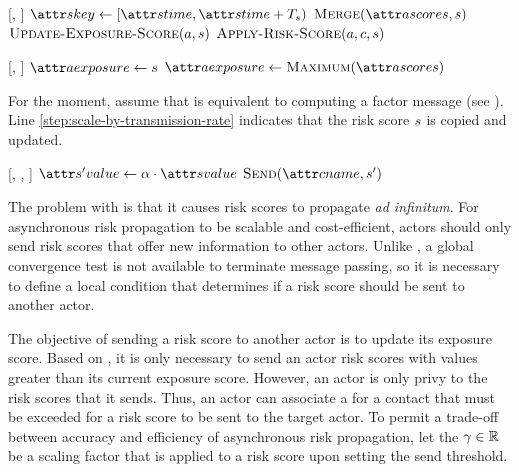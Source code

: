 \begin{function}[H]{\nHandleRiskScore}[\vActor, \vScore]
    \State $\aScoreKey \assign [\aScoreTime, \aScoreTime + \pScoreExpiry)$
    \State $\cMerge[\aActorScores, \vScore]$
    \State $\cUpdateExposureScore[\vActor, \vScore]$
    \ForEach{$\vContact \in \aActorContacts$}
      \State $\cApplyRiskScore[\vActor, \vContact, \vScore]$
    \EndFor
  \EndIf
\end{function}

\begin{function}[H]{\nUpdateExposureScore}[\vActor, \vScore]
  \If{$\aActorExposureValue < \aScoreValue$}
    \State $\aActorExposure \assign \vScore$
    \State $\aActorExposure \assign \cMaximum[\aActorScores]$
  \EndIf
\end{function}

For the moment, assume that \cApplyRiskScore{} is equivalent to computing a factor message (see ). Line \ref{step:scale-by-transmission-rate} indicates that the risk score $s$ is copied and updated.

\begin{function}[H]{\nApplyRiskScore}[\vActor, \vContact, \vScore]
  \If{$\aContactTime + \pTimeBuffer > \aScoreTime$}
    \State $\aNewScoreValue \assign \pTransmissionRate \cdot \aScoreValue$ \label{step:scale-by-transmission-rate}
    \State $\cSend[\aContactName, \vNewScore]$
  \EndIf
\end{function}

The problem with \cApplyRiskScore{} is that it causes risk scores to propagate \textit{ad infinitum}. For asynchronous risk propagation to be scalable and cost-efficient, actors should only send risk scores that offer new information to other actors. Unlike \cRiskPropagation{}, a global convergence test is not available to terminate message passing, so it is necessary to define a local condition that determines if a risk score should be sent to another actor.

The objective of sending a risk score to another actor is to update its exposure score. Based on \cHandleRiskScore{}, it is only necessary to send an actor risk scores with values greater than its current exposure score. However, an actor is only privy to the risk scores that it sends. Thus, an actor can associate a  for a contact that must be exceeded for a risk score to be sent to the target actor. To permit a trade-off between accuracy and efficiency of asynchronous risk propagation, let the  $\gamma \in \mathbb{R}$ be a scaling factor that is applied to a risk score upon setting the send threshold.


